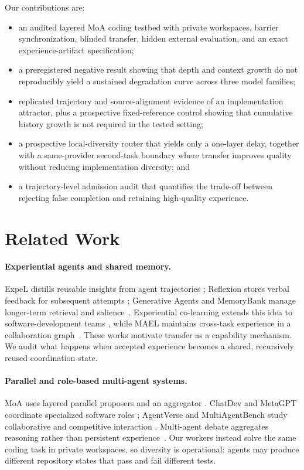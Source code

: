 \documentclass[letterpaper]{article}
\begin{document}
Our contributions are:
\begin{itemize}
    \item an audited layered MoA coding testbed with private workspaces, barrier
    synchronization, blinded transfer, hidden external evaluation, and an exact
    experience-artifact specification;
    \item a preregistered negative result showing that depth and context growth do
    not reproducibly yield a sustained degradation curve across three model
    families;
    \item replicated trajectory and source-alignment evidence of an implementation
    attractor, plus a prospective fixed-reference control showing that cumulative
    history growth is not required in the tested setting;
    \item a prospective local-diversity router that yields only a one-layer delay,
    together with a same-provider second-task boundary where transfer improves
    quality without reducing implementation diversity; and
    \item a trajectory-level admission audit that quantifies the trade-off between
    rejecting false completion and retaining high-quality experience.
\end{itemize}

\section{Related Work}

\paragraph{Experiential agents and shared memory.}
ExpeL distills reusable insights from agent trajectories
\citep{zhao2024expel}; Reflexion stores verbal feedback for subsequent attempts
\citep{shinn2023reflexion}; Generative Agents and MemoryBank manage longer-term
retrieval and salience~\citep{park2023generative,zhong2024memorybank}. Experiential
co-learning extends this idea to software-development teams
\citep{qian2024colearning}, while MAEL maintains cross-task experience in a
collaboration graph~\citep{li2025mael_full}. These works motivate transfer as a
capability mechanism. We audit what happens when accepted experience becomes a
shared, recursively reused coordination state.

\paragraph{Parallel and role-based multi-agent systems.}
MoA uses layered parallel proposers and an aggregator
\citep{wang2024moa}. ChatDev and MetaGPT coordinate specialized software roles
\citep{qian2024chatdev,hong2024metagpt}; AgentVerse and MultiAgentBench study
collaborative and competitive interaction
\citep{chen2023agentverse,zhu2025multiagentbench}. Multi-agent debate aggregates
reasoning rather than persistent experience~\citep{du2024debate}. Our workers
instead solve the same coding task in private workspaces, so diversity is
operational: agents may produce different repository states that pass and fail
different tests.
\end{document}

